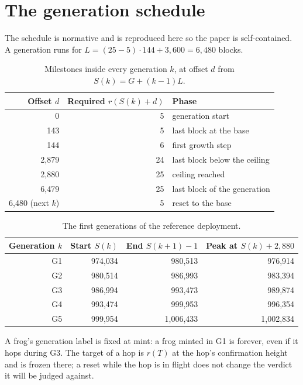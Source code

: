 \section{The generation schedule}\label{app:schedule}

The schedule is normative and is reproduced here so the paper is
self-contained. A generation runs for
$L=(25-5)\cdot144+3{,}600=6{,}480$ blocks.

\begin{table}[H]
\centering
\small
\caption{Milestones inside every generation $k$, at offset
$d$ from $S(k)=G+(k-1)L$.}
\label{tab:generation-milestones}
\begin{tabular}{@{}rrl@{}}
\toprule
\textbf{Offset $d$} & \textbf{Required $r(S(k)+d)$} & \textbf{Phase} \\
\midrule
0                    & 5  & generation start \\
143                  & 5  & last block at the base \\
144                  & 6  & first growth step \\
2{,}879              & 24 & last block below the ceiling \\
2{,}880              & 25 & ceiling reached \\
6{,}479              & 25 & last block of the generation \\
6{,}480 (next $k$)   & 5  & reset to the base \\
\bottomrule
\end{tabular}
\end{table}

\begin{table}[H]
\centering
\small
\caption{The first generations of the reference deployment.}
\label{tab:generations}
\begin{tabular}{@{}rrrr@{}}
\toprule
\textbf{Generation $k$} & \textbf{Start $S(k)$} & \textbf{End $S(k+1)-1$} &
\textbf{Peak at $S(k)+2{,}880$} \\
\midrule
G1 & 974{,}034 & 980{,}513 & 976{,}914 \\
G2 & 980{,}514 & 986{,}993 & 983{,}394 \\
G3 & 986{,}994 & 993{,}473 & 989{,}874 \\
G4 & 993{,}474 & 999{,}953 & 996{,}354 \\
G5 & 999{,}954 & 1{,}006{,}433 & 1{,}002{,}834 \\
\bottomrule
\end{tabular}
\end{table}

\noindent
A frog's generation label is fixed at mint: a frog minted in G1 is
 forever, even if it hops during G3. The target of a hop is
$r(T)$ at the hop's confirmation height and is frozen there; a reset while
the hop is in flight does not change the verdict it will be judged against.
